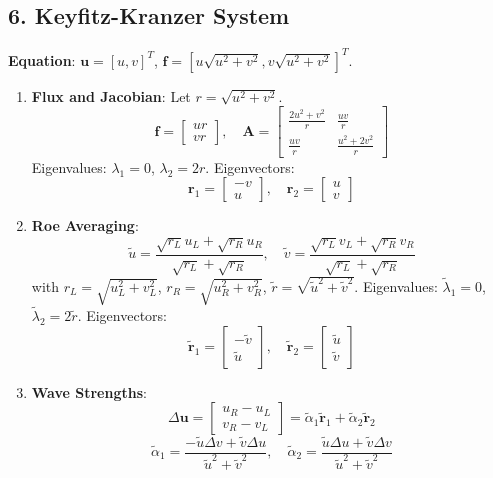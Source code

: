 \documentclass[12pt]{article}
\begin{document}
\subsection*{6. Keyfitz-Kranzer System}
\textbf{Equation}: \(\mathbf{u} = [u, v]^T\), \(\mathbf{f} = [u \sqrt{u^2 + v^2}, v \sqrt{u^2 + v^2}]^T\).

\begin{enumerate}
    \item \textbf{Flux and Jacobian}:
    Let \( r = \sqrt{u^2 + v^2} \).
    \[
    \mathbf{f} = \begin{bmatrix} u r \\ v r \end{bmatrix}, \quad \mathbf{A} = \begin{bmatrix} \frac{2u^2 + v^2}{r} & \frac{u v}{r} \\ \frac{u v}{r} & \frac{u^2 + 2v^2}{r} \end{bmatrix}
    \]
    Eigenvalues: \(\lambda_1 = 0\), \(\lambda_2 = 2r\). Eigenvectors:
    \[
    \mathbf{r}_1 = \begin{bmatrix} -v \\ u \end{bmatrix}, \quad \mathbf{r}_2 = \begin{bmatrix} u \\ v \end{bmatrix}
    \]

    \item \textbf{Roe Averaging}:
    \[
    \tilde{u} = \frac{\sqrt{r_L} u_L + \sqrt{r_R} u_R}{\sqrt{r_L} + \sqrt{r_R}}, \quad \tilde{v} = \frac{\sqrt{r_L} v_L + \sqrt{r_R} v_R}{\sqrt{r_L} + \sqrt{r_R}}
    \]
    with \( r_L = \sqrt{u_L^2 + v_L^2} \), \( r_R = \sqrt{u_R^2 + v_R^2} \), \(\tilde{r} = \sqrt{\tilde{u}^2 + \tilde{v}^2}\).
    Eigenvalues: \(\tilde{\lambda}_1 = 0\), \(\tilde{\lambda}_2 = 2 \tilde{r}\). Eigenvectors:
    \[
    \tilde{\mathbf{r}}_1 = \begin{bmatrix} -\tilde{v} \\ \tilde{u} \end{bmatrix}, \quad \tilde{\mathbf{r}}_2 = \begin{bmatrix} \tilde{u} \\ \tilde{v} \end{bmatrix}
    \]

    \item \textbf{Wave Strengths}:
    \[
    \Delta \mathbf{u} = \begin{bmatrix} u_R - u_L \\ v_R - v_L \end{bmatrix} = \tilde{\alpha}_1 \tilde{\mathbf{r}}_1 + \tilde{\alpha}_2 \tilde{\mathbf{r}}_2
    \]
    \[
    \tilde{\alpha}_1 = \frac{-\tilde{u} \Delta v + \tilde{v} \Delta u}{\tilde{u}^2 + \tilde{v}^2}, \quad \tilde{\alpha}_2 = \frac{\tilde{u} \Delta u + \tilde{v} \Delta v}{\tilde{u}^2 + \tilde{v}^2}
    \]


\end{enumerate}
\end{document}

